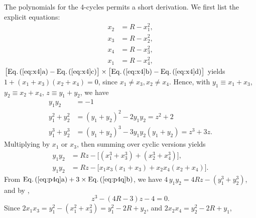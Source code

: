 \documentclass{ws-ijbc}
\begin{document}









The polynomials for the 4-cycles permits a short derivation.
We first list the explicit equations:
%
%
%
\begin{subequations}
\label{eq:x4}
\begin{align}
  x_2 &= R - x_1^2, \\
  x_3 &= R - x_2^2, \\
  x_4 &= R - x_3^2, \\
  x_1 &= R - x_4^2,
\end{align}
\end{subequations}
%
$\big[\mathrm{\refeqsub{x4}{a}} - \mathrm{\refeqsub{x4}{c}}\big]
\times
\big[\mathrm{\refeqsub{x4}{b}} - \mathrm{\refeqsub{x4}{d}}\big]$
yields $1 + (x_1 + x_3) (x_2 + x_4) = 0$,
since $x_1 \ne x_3, x_2 \ne x_4$.
%
Hence, with
$y_1 \equiv x_1 + x_3$, $y_2 \equiv x_2 + x_4$,
$z \equiv y_1 + y_2$,
we have
%
%
%
\begin{subequations}
\begin{align}
y_1 y_2       &= -1 \\
y_1^2 + y_2^2 & = (y_1 + y_2)^2 - 2 y_1 y_2 = z^2 + 2 \\
y_1^3 + y_2^3 & = (y_1 + y_2)^3 - 3 y_1 y_2 (y_1 + y_2) = z^3 + 3 z.
\end{align}
\label{eq:ypow4}
\end{subequations}
%
%
Multiplying  by $x_1$ or $x_3$,
then summing over cyclic versions yields
\begin{subequations}
\begin{align}
y_1 y_2 &= R z - \big[(x_1^3 + x_3^3) + (x_2^3 + x_4^3)\big],\\
y_1 y_2 &= R z - \big[x_1 x_3 (x_1 + x_3) + x_2 x_4 (x_2 + x_4)\big].
\end{align}
\label{eq:p4q}
\end{subequations}
%
From
$\mathrm{\refeqsub{p4q}{a}} + 3 \times \mathrm{\refeqsub{p4q}{b}}$,
we have
$4 \, y_1 y_2 = 4 R z - (y_1^3 + y_2^3)$,
%
and by ,
\begin{equation}
  z^3 - (4 R - 3) z - 4 = 0.
  \label{eq:xr4s}
\end{equation}
%
%
Since $2 x_1 x_3 = y_1^2 - (x_1^2 + x_3^2) = y_1^2 - 2 R + y_2$,
and $2 x_2 x_4 = y_2^2 - 2 R + y_1$,
\end{document}
